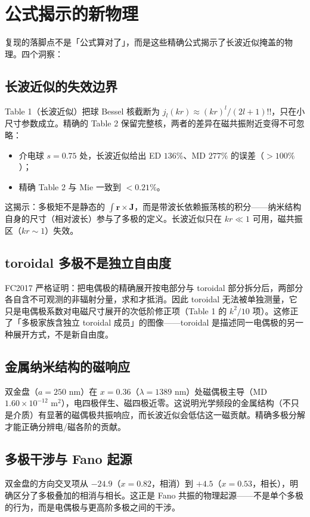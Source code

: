 \section{公式揭示的新物理}

复现的落脚点不是「公式算对了」，而是这些精确公式揭示了长波近似掩盖的物理。四个洞察：

\subsection{长波近似的失效边界}

Table 1（长波近似）把球 Bessel 核截断为 $j_l(kr)\approx(kr)^l/(2l+1)!!$，只在小尺寸参数成立。精确的 Table 2 保留完整核，两者的差异在磁共振附近变得不可忽略：

\begin{itemize}
  \item 介电球 $s=0.75$ 处，长波近似给出 ED $136\%$、MD $277\%$ 的误差（$>100\%$）；
  \item 精确 Table 2 与 Mie 一致到 $<0.21\%$。
\end{itemize}

这揭示：多极矩不是静态的 $\int\mathbf r\times\mathbf J$，而是带波长依赖振荡核的积分——纳米结构自身的尺寸（相对波长）参与了多极的定义。长波近似只在 $kr\ll1$ 可用，磁共振区（$kr\sim1$）失效。

\subsection{toroidal 多极不是独立自由度}

FC2017 严格证明：把电偶极的精确展开按电部分与 toroidal 部分拆分后，两部分各自含不可观测的非辐射分量，求和才抵消。因此 toroidal 无法被单独测量，它只是电偶极系数对电磁尺寸展开的次低阶修正项（Table 1 的 $k^2/10$ 项）。这修正了「多极家族含独立 toroidal 成员」的图像——toroidal 是描述同一电偶极的另一种展开方式，不是新自由度。

\subsection{金属纳米结构的磁响应}

双金盘（$a=250$ nm）在 $x=0.36$（$\lambda=1389$ nm）处磁偶极主导（MD $1.60\times10^{-12}$ m$^2$），电四极伴生、磁四极近零。这说明光学频段的金属结构（不只是介质）有显著的磁偶极共振响应，而长波近似会低估这一磁贡献。精确多极分解才能正确分辨电/磁各阶的贡献。

\subsection{多极干涉与 Fano 起源}

双金盘的方向交叉项从 $-24.9$（$x=0.82$，相消）到 $+4.5$（$x=0.53$，相长），明确区分了多极叠加的相消与相长。这正是 Fano 共振的物理起源——不是单个多极的行为，而是电偶极与更高阶多极之间的干涉。
